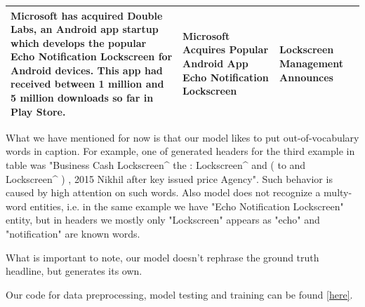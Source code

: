 \begin{center}
\begin{table}[!htb]
\begin{tabular}{|l|l|l|}
\begin{minipage}[t]{0.4\columnwidth}%
Microsoft has acquired Double Labs, an Android app startup which develops the popular Echo Notification Lockscreen for Android devices. This app had received between 1 million and 5 million downloads so far in Play Store.          
\end{minipage}
 & 
\begin{minipage}[t]{0.3\columnwidth}%
Microsoft Acquires Popular Android App Echo Notification Lockscreen
\end{minipage}
 & 
\begin{minipage}[t]{0.3\columnwidth}%
Lockscreen Management Announces
\end{minipage}  \\ \hline

\end{tabular}
\end{table}
\end{center}

 

What we have mentioned for now is that our model likes to put out-of-vocabulary words in caption. For example, one of generated headers for the third example in table was "Business Cash Lockscreen\^{} the : Lockscreen\^{} and ( to and Lockscreen\^{} ) , 2015 Nikhil after key issued price Agency". Such behavior is caused by high attention on such words. Also model does not recognize a multy-word entities, i.e. in the same example we have "Echo Notification Lockscreen" entity, but in headers we mostly only "Lockscreen" appears as "echo" and "notification" are known words.

What is important to note, our model doesn't rephrase the ground truth headline, but generates its own.

Our code for data preprocessing, model testing and training can be found \href{https://github.com/mykhaly/text_summarization_using_LSTM}{[here]}.


